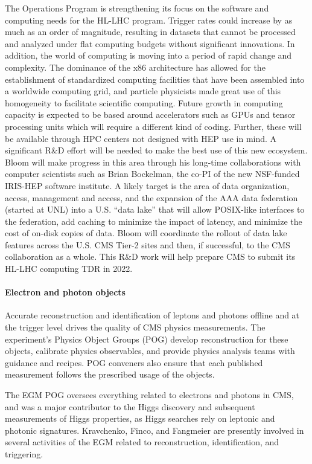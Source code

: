The Operations Program is strengthening its focus on the software and computing needs for the HL-LHC program.  Trigger rates could increase by as much as an order of magnitude, resulting in datasets that cannot be processed and analyzed under flat computing budgets without significant innovations.  In addition, the world of computing is moving into a period of rapid change and complexity.  The dominance of the x86 architecture has allowed for the establishment of standardized computing facilities that have been assembled into a worldwide computing grid, and particle physicists made great use of this homogeneity to facilitate scientific computing.  Future growth in computing capacity is expected to be based around accelerators such as GPUs and tensor processing units which will require a different kind of coding.  Further, these will be available through HPC centers  not designed with HEP use in mind.  A significant R\&D effort will be needed to make the best use of this new ecosystem.  Bloom will make progress in this area through his long-time collaborations with computer scientists such as Brian Bockelman, the co-PI of the new NSF-funded IRIS-HEP software institute.  A likely target is the area of data organization, access, management and access, and the expansion of the AAA data federation (started at UNL) into a U.S. ``data lake'' that will allow POSIX-like interfaces to the federation, add caching to minimize the impact of latency, and minimize the cost of on-disk copies of data.  Bloom will coordinate the rollout of data lake features across the U.S. CMS Tier-2 sites and then, if successful, to the CMS collaboration as a whole.  This R\&D work will help prepare CMS to submit its HL-LHC computing TDR in 2022.

\paragraph{Electron and photon objects}
Accurate reconstruction and identification of leptons and photons offline and at the trigger level drives the quality of CMS physics measurements. The experiment's Physics Object Groups (POG) develop reconstruction for these objects, calibrate physics observables, and provide  physics analysis teams  with guidance and recipes. POG conveners also ensure that each published measurement follows the prescribed usage of the objects. 

The EGM POG oversees everything related to electrons and photons in CMS, and was a major contributor to the Higgs discovery and subsequent measurements of Higgs properties, as Higgs searches rely on leptonic and photonic signatures. Kravchenko, Finco, and Fangmeier are presently involved in several activities of the EGM related to reconstruction, identification, and triggering.

